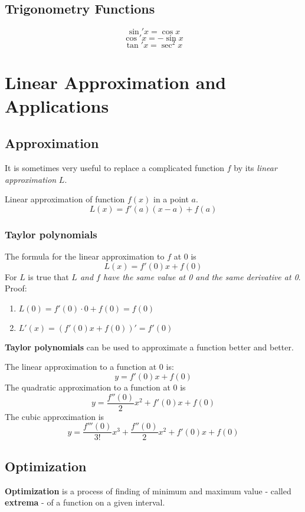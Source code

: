\documentclass[12pt, a4paper]{scrartcl}
\begin{document}
\subsection{Trigonometry Functions}
$$\sin'{x} = \cos{x}$$
$$\cos'{x} = -\sin{x}$$
$$\tan'{x} = \sec^2{x}$$

\section{Linear Approximation and Applications}
\label{sec:applications}

\subsection{Approximation}
\label{sec:application:approximation}

It is sometimes very useful to replace a complicated function $f$ by its \textit{linear approximation} $L$.\par
Linear approximation of function $f(x)$ in a point $a$.
$$L(x) = f'(a)(x-a) + f(a)$$

\subsubsection{Taylor polynomials}
\label{sec:application:approximation:taylor_polynomials}
The formula for the linear approximation to $f$ at 0 is $$L(x) = f'(0)x + f(0)$$
For $L$ is true that \textit{$L$ and $f$ have the same value at 0 and the same derivative at 0}.\\
Proof: \begin{enumerate}
    \item $L(0) = f'(0) \cdot 0 + f(0) = f(0)$
    \item $L'(x) = (f'(0)x + f(0))' = f'(0)$
\end{enumerate}
\textbf{Taylor polynomials} can be used to approximate a function better and better.\par
The linear approximation to a function at 0 is: $$y=f'(0)x + f(0)$$
The quadratic approximation to a function at 0 is $$y=\dfrac{f''(0)}{2}x^2 + f'(0)x + f(0)$$
The cubic approximation is $$y = \dfrac{f'''(0)}{3!}x^3 + \dfrac{f''(0)}{2}x^2 + f'(0)x + f(0)$$

\subsection{Optimization}
\label{sec:application:optimization}
\textbf{Optimization} is a process of finding of minimum and maximum value - called \textbf{extrema} - of a function on a given interval.
\end{document}

